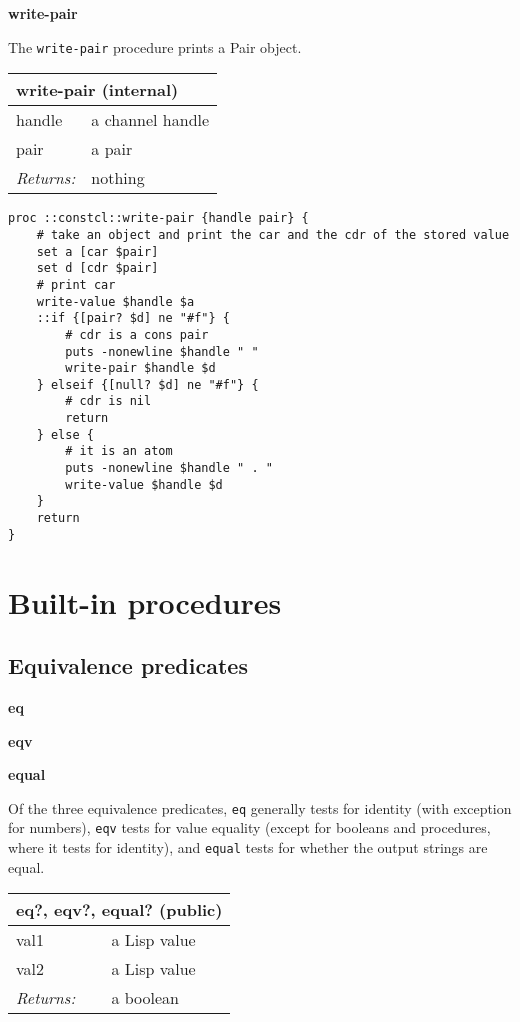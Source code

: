 \documentclass{report}
\begin{document}
\textbf{write-pair}


The \texttt{write-pair} procedure prints a Pair object.

\begin{tabular}{ |l l| }
\hline
\multicolumn{2}{|l|}{write-pair (internal)} \\
\hline
handle & a channel handle \\
pair & a pair \\
\textit{Returns:} & nothing \\
\hline
\end{tabular}

\noindent\makebox[\linewidth]{\rule{\linewidth}{0.4pt}}
\begin{lstlisting}
proc ::constcl::write-pair {handle pair} {
    # take an object and print the car and the cdr of the stored value
    set a [car $pair]
    set d [cdr $pair]
    # print car
    write-value $handle $a
    ::if {[pair? $d] ne "#f"} {
        # cdr is a cons pair
        puts -nonewline $handle " "
        write-pair $handle $d
    } elseif {[null? $d] ne "#f"} {
        # cdr is nil
        return
    } else {
        # it is an atom
        puts -nonewline $handle " . "
        write-value $handle $d
    }
    return
}
\end{lstlisting}
\noindent\makebox[\linewidth]{\rule{\linewidth}{0.4pt}}
\section{Built-in procedures}
\label{built-in-procedures}
\subsection{Equivalence predicates}
\label{equivalence-predicates}

\textbf{eq}


\textbf{eqv}


\textbf{equal}


Of the three equivalence predicates, \texttt{eq} generally tests for identity (with exception for numbers), \texttt{eqv} tests for value equality (except for booleans and procedures, where it tests for identity), and \texttt{equal} tests for whether the output strings are equal.

\begin{tabular}{ |l l| }
\hline
\multicolumn{2}{|l|}{eq?, eqv?, equal? (public)} \\
\hline
val1 & a Lisp value \\
val2 & a Lisp value \\
\textit{Returns:} & a boolean \\
\hline
\end{tabular}
\end{document}
